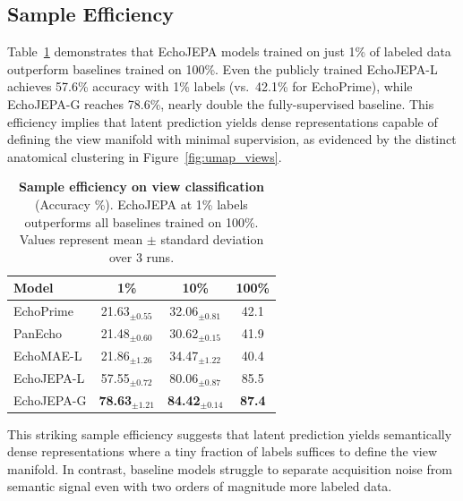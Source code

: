 \documentclass{article}
\theoremstyle{plain}
\theoremstyle{definition}
\theoremstyle{remark}
\begin{document}
\subsection{Sample Efficiency}
\label{sec:exp:efficiency}

Table~\ref{tab:sample_efficiency} demonstrates that EchoJEPA models trained on just 1\% of labeled data outperform baselines trained on 100\%. Even the publicly trained EchoJEPA-L achieves 57.6\% accuracy with 1\% labels (vs.\ 42.1\% for EchoPrime), while EchoJEPA-G reaches 78.6\%, nearly double the fully-supervised baseline. This efficiency implies that latent prediction yields dense representations capable of defining the view manifold with minimal supervision, as evidenced by the distinct anatomical clustering in Figure~\ref{fig:umap_views}.

\begin{table}[t]
    \centering
\caption{\textbf{Sample efficiency on view classification} (Accuracy \%). 
EchoJEPA at 1\% labels outperforms all baselines trained on 100\%. Values represent mean $\pm$ standard deviation over 3 runs.}
    \label{tab:sample_efficiency}
    \vspace{0.5em}
    \small
    \begin{tabular}{@{}lccc@{}}
        \toprule
        \textbf{Model} & \textbf{1\%} & \textbf{10\%} & \textbf{100\%} \\
        \midrule
        EchoPrime & 21.63$_{\pm 0.55}$ & 32.06$_{\pm 0.81}$ & 42.1 \\
        PanEcho & 21.48$_{\pm 0.60}$ & 30.62$_{\pm 0.15}$ & 41.9 \\
        \midrule
        EchoMAE-L & 21.86$_{\pm 1.26}$ & 34.47$_{\pm 1.22}$ & 40.4 \\
        EchoJEPA-L & 57.55$_{\pm 0.72}$ & 80.06$_{\pm 0.87}$ & 85.5 \\
        EchoJEPA-G & \textbf{78.63}$_{\pm 1.21}$ & \textbf{84.42}$_{\pm 0.14}$ & \textbf{87.4} \\
        \bottomrule
    \end{tabular}
\end{table}

This striking sample efficiency suggests that latent prediction yields semantically dense representations where a tiny fraction of labels suffices to define the view manifold. In contrast, baseline models struggle to separate acquisition noise from semantic signal even with two orders of magnitude more labeled data.

\end{document}
